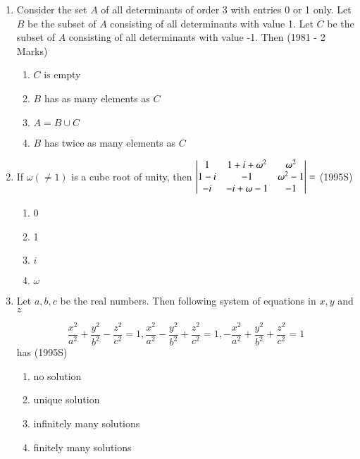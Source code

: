 \documentclass[journal]{IEEEtran}
\begin{document}
\begin{enumerate}
	\item Consider the set $A$ of all determinants of order 3 with entries
		0 or 1 only. Let $B$ be the subset of $A$ consisting of all
		determinants with value 1. Let $C$ be the subset of $A$ consisting
		of all determinants with value -1. Then
		\hfill (1981 - 2 Marks)
		\begin{multicols}{2}
			\begin{enumerate}
				\item $C$ is empty
				\item $B$ has as many elements as $C$
				\item $A = B \cup C$
				\item $B$ has twice as many elements as $C$
			\end{enumerate}
		\end{multicols}

	\item If $\omega (\ne 1)$ is a cube root of unity, then
		$\begin{vmatrix}
			1 & 1 + i + \omega^2 & \omega^2 \\
			1 - i & -1 & \omega^2 - 1 \\
			-i & -i + \omega - 1 & -1
		\end{vmatrix} = $
		\hfill (1995S)
	
		\begin{multicols}{4}
			\begin{enumerate}
				\item 0
				\item 1
				\item $i$
				\item $\omega$
			\end{enumerate}
		\end{multicols}

	\item Let $a, b, c$ be the real numbers. Then following system of
		equations in $x, y$ and $z$ 

		$$
		\frac{x^2}{a^2} + \frac{y^2}{b^2} - \frac{z^2}{c^2} = 1	,
		\frac{x^2}{a^2} - \frac{y^2}{b^2} + \frac{z^2}{c^2} = 1	,
		-\frac{x^2}{a^2} + \frac{y^2}{b^2} + \frac{z^2}{c^2} = 1
		$$ has	
		\hfill (1995S)

		\begin{multicols}{2}
			\begin{enumerate}
				\item no solution
				\item unique solution
				\columnbreak
				\item infinitely many solutions
				\item finitely many solutions
			\end{enumerate}
		\end{multicols}


\end{enumerate}
\end{document}
